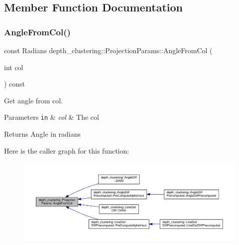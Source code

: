 \subsection{Member Function Documentation}
\mbox{\label{classdepth__clustering_1_1ProjectionParams_aa5cf587adef5383e263a4e9a20de50ff}} 
\subsubsection{\texorpdfstring{Angle\+From\+Col()}{AngleFromCol()}}
{\footnotesize\ttfamily const Radians depth\+\_\+clustering\+::\+Projection\+Params\+::\+Angle\+From\+Col (\begin{DoxyParamCaption}\item[{int}]{col }\end{DoxyParamCaption}) const}



Get angle from col. 


\begin{DoxyParams}[1]{Parameters}
\mbox{\tt in}  & {\em col} & The col\\
\hline
\end{DoxyParams}
\begin{DoxyReturn}{Returns}
Angle in radians 
\end{DoxyReturn}
Here is the caller graph for this function\+:\nopagebreak
\begin{figure}[H]
\begin{center}
\leavevmode
\includegraphics[width=350pt]{classdepth__clustering_1_1ProjectionParams_aa5cf587adef5383e263a4e9a20de50ff_icgraph}
\end{center}
\end{figure}
\mbox{\label{classdepth__clustering_1_1ProjectionParams_adc48aa54d8c0c1da8167ab4001a83131}} 
